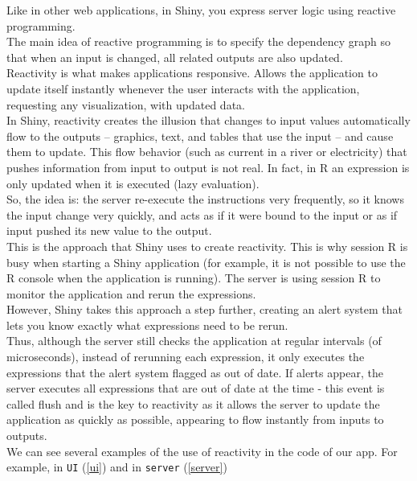 Like in other web applications, in Shiny, you express server logic using reactive programming.
\\
The main idea of reactive programming is to specify the dependency graph so that when an input is changed, all related outputs are also updated. 
\\
Reactivity is what makes applications responsive. Allows the application to update itself instantly whenever the user interacts with the application, requesting any visualization, with updated data.
\\
In Shiny, reactivity creates the illusion that changes to input values automatically flow to the outputs -- graphics, text, and tables that use the input --  and cause them to update. This flow behavior (such as current in a river or electricity) that pushes information from input to output is not real. In fact, in R an expression is only updated when it is executed (lazy evaluation).
\\
So, the idea is: the server re-execute the instructions very frequently, so it knows the input change very quickly, and acts as if it were bound to the input or as if input pushed its new value to the output.
\\
This is the approach that Shiny uses to create reactivity. This is why session R is busy when starting a Shiny application (for example, it is not possible to use the R console when the application is running). The server is using session R to monitor the application and rerun the expressions.
\\
However, Shiny takes this approach a step further, creating an alert system that lets you know exactly what expressions need to be rerun.
\\
Thus, although the server still checks the application at regular intervals (of microseconds), instead of rerunning each expression, it only executes the expressions that the alert system flagged as out of date. If alerts appear, the server executes all expressions that are out of date at the time - this event is called flush and is the key to reactivity as it allows the server to update the application as quickly as possible, appearing to flow instantly from inputs to outputs.
\\
We can see several examples of the use of reactivity in the code of our app. For example, in \verb!UI! (\ref{ui}) and in \verb!server! (\ref{server})
